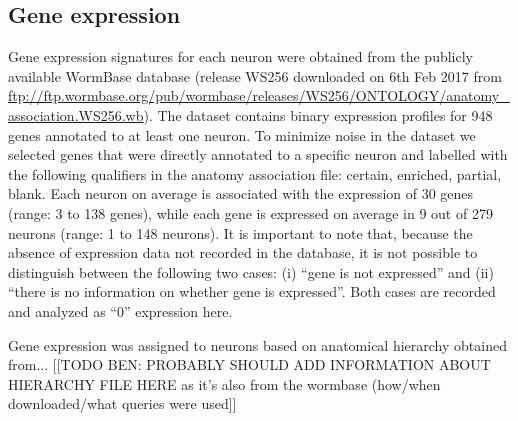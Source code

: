 \documentclass[10pt,letterpaper]{article}
\begin{document}
\subsection*{Gene expression}
Gene expression signatures for each neuron were obtained from the publicly available WormBase database (release WS256 downloaded on 6th Feb 2017 from \url{ftp://ftp.wormbase.org/pub/wormbase/releases/WS256/ONTOLOGY/anatomy_association.WS256.wb}).
The dataset contains binary expression profiles for 948 genes annotated to at least one neuron.
To minimize noise in the dataset we selected genes that were directly annotated to a specific neuron and labelled with the following qualifiers in the anatomy association file: certain, enriched, partial, blank.
Each neuron on average is associated with the expression of 30 genes (range: 3 to 138 genes), while each gene is expressed on average in 9 out of 279 neurons (range: 1 to 148 neurons).
It is important to note that, because the absence of expression data not recorded in the database, it is not possible to distinguish between the following two cases: (i) ``gene is not expressed'' and (ii) ``there is no information on whether gene is expressed''.
Both cases are recorded and analyzed as ``0'' expression here.

Gene expression was assigned to neurons based on anatomical hierarchy obtained from...
[[TODO BEN: PROBABLY SHOULD ADD INFORMATION ABOUT HIERARCHY FILE HERE as it's also from the wormbase (how/when downloaded/what queries were used]]

\end{document}
